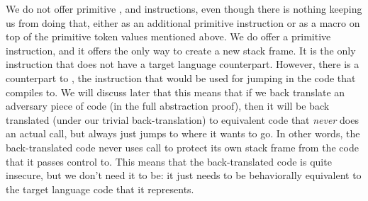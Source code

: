 \documentclass[a4paper]{article}
\begin{document}
We do not offer primitive \sreturn{}, \spush{} and \spop{} instructions, even though there is nothing keeping us from doing that, either as an additional primitive instruction or as a macro on top of the primitive token values mentioned above.
We do offer a primitive  instruction, and it offers the only way to create a new stack frame.
It is the only instruction that does not have a target language counterpart.
However, there is a counterpart to \sxjmp{}{}, the instruction that would be used for jumping in the code that  compiles to.
We will discuss later that this means that if we back translate an adversary piece of code (in the full abstraction proof), then it will be back translated (under our trivial back-translation) to equivalent code that \emph{never} does an actual call, but always just jumps to where it wants to go.
In other words, the back-translated code never uses call to protect its own stack frame from the code that it passes control to.
This means that the back-translated code is quite insecure, but we don't need it to be: it just needs to be behaviorally equivalent to the target language code that it represents.

\end{document}
